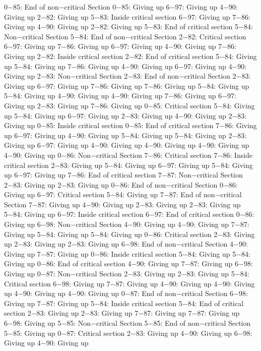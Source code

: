 0−85: End of non−critical Section
0−85: Giving up
6−97: Giving up
4−90: Giving up
2−82: Giving up
5−83: Inside critical section
6−97: Giving up
7−86: Giving up
4−90: Giving up
2−82: Giving up
5−83: End of critical section
5−84: Non−critical Section
5−84: End of non−critical Section
2−82: Critical section
6−97: Giving up
7−86: Giving up
6−97: Giving up
4−90: Giving up
7−86: Giving up
2−82: Inside critical section
2−82: End of critical section
5−84: Giving up
5−84: Giving up
7−86: Giving up
4−90: Giving up
6−97: Giving up
4−90: Giving up
2−83: Non−critical Section
2−83: End of non−critical Section
2−83: Giving up
6−97: Giving up
7−86: Giving up
7−86: Giving up
5−84: Giving up
5−84: Giving up
4−90: Giving up
4−90: Giving up
7−86: Giving up
6−97: Giving up
2−83: Giving up
7−86: Giving up
0−85: Critical section
5−84: Giving up
5−84: Giving up
6−97: Giving up
2−83: Giving up
4−90: Giving up
2−83: Giving up
0−85: Inside critical section
0−85: End of critical section
7−86: Giving up
6−97: Giving up
4−90: Giving up
5−84: Giving up
5−84: Giving up
2−83: Giving up
6−97: Giving up
4−90: Giving up
4−90: Giving up
4−90: Giving up
4−90: Giving up
0−86: Non−critical Section
7−86: Critical section
7−86: Inside critical section
2−83: Giving up
5−84: Giving up
6−97: Giving up
5−84: Giving up
6−97: Giving up
7−86: End of critical section
7−87: Non−critical Section
2−83: Giving up
2−83: Giving up
0−86: End of non−critical Section
0−86: Giving up
6−97: Critical section
5−84: Giving up
7−87: End of non−critical Section
7−87: Giving up
4−90: Giving up
2−83: Giving up
2−83: Giving up
5−84: Giving up
6−97: Inside critical section
6−97: End of critical section
0−86: Giving up
6−98: Non−critical Section
4−90: Giving up
4−90: Giving up
7−87: Giving up
5−84: Giving up
5−84: Giving up
0−86: Critical section
2−83: Giving up
2−83: Giving up
2−83: Giving up
6−98: End of non−critical Section
4−90: Giving up
7−87: Giving up
0−86: Inside critical section
5−84: Giving up
5−84: Giving up
0−86: End of critical section
4−90: Giving up
7−87: Giving up
6−98: Giving up
0−87: Non−critical Section
2−83: Giving up
2−83: Giving up
5−84: Critical section
6−98: Giving up
7−87: Giving up
4−90: Giving up
4−90: Giving up
4−90: Giving up
4−90: Giving up
0−87: End of non−critical Section
6−98: Giving up
7−87: Giving up
5−84: Inside critical section
5−84: End of critical section
2−83: Giving up
2−83: Giving up
7−87: Giving up
7−87: Giving up
6−98: Giving up
5−85: Non−critical Section
5−85: End of non−critical Section
5−85: Giving up
0−87: Critical section
2−83: Giving up
4−90: Giving up
6−98: Giving up
4−90: Giving up
